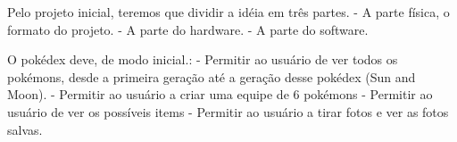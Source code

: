 \documentclass[../main.tex]{subfiles}
\begin{document}
Pelo projeto inicial, teremos que dividir a idéia em três partes. \newline
- A parte física, o formato do projeto. \newline
- A parte do hardware. \newline
- A parte do software. \newline

O pokédex deve, de modo inicial.: \newline
- Permitir ao usuário de ver todos os pokémons, desde a primeira geração até a geração desse pokédex (Sun and Moon). \newline
- Permitir ao usuário a criar uma equipe de 6 pokémons \newline
- Permitir ao usuário de ver os possíveis items \newline
- Permitir ao usuário a tirar fotos e ver as fotos salvas. \newline
\end{document}
